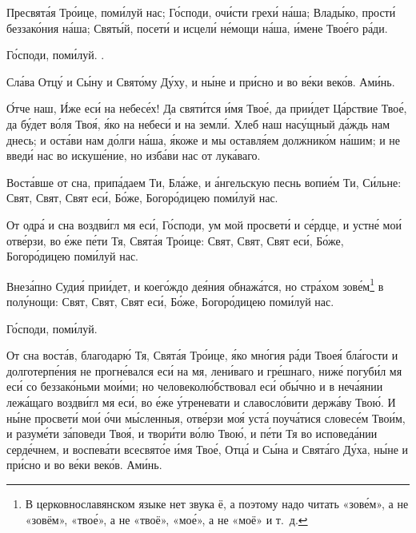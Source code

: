 \begin{mymulticols}

Пресвят\'{а}я Тр\'{о}ице, пом\'{и}луй нас; Г\'{о}споди, оч\'{и}сти грех\'{и} н\'{а}ша; Влад\'{ы}ко, прост\'{и} беззак\'{о}ния н\'{а}ша; Свят\'{ы}й, посет\'{и} и исцел\'{и} н\'{е}мощи н\'{а}ша, \'{и}мене Тво\'{е}го р\'{а}ди.

Г\'{о}споди, пом\'{и}луй. .

Сл\'{а}ва Отц\'{у} и С\'{ы}ну и Свят\'{о}му Д\'{у}ху, и н\'{ы}не и пр\'{и}сно и во в\'{е}ки век\'{о}в. Ам\'{и}нь.


\'{О}тче наш, \'{И}же ес\'{и} на небес\'{е}х! Да свят\'{и}тся \'{и}мя Тво\'{е}, да при\'{и}дет Ц\'{а}рствие Тво\'{е}, да б\'{у}дет в\'{о}ля Тво\'{я}, \'{я}ко на небес\'{и} и на земл\'{и}. Хлеб наш нас\'{у}щный д\'{а}ждь нам днесь; и ост\'{а}ви нам д\'{о}лги н\'{а}ша, \'{я}коже и мы оставл\'{я}ем должник\'{о}м н\'{а}шим; и не введ\'{и} нас во искуш\'{е}ние, но изб\'{а}ви нас от лук\'{а}ваго.


Вост\'{а}вше от сна, прип\'{а}даем Ти, Бл\'{а}же, и \'{а}нгельскую песнь вопи\'{е}м Ти, С\'{и}льне: Свят, Свят, Свят ес\'{и}, Б\'{о}же, Богор\'{о}дицею пом\'{и}луй нас.

\slavan

От одр\'{а} и сна воздв\'{и}гл мя ес\'{и}, Г\'{о}споди, ум мой просвет\'{и} и с\'{е}рдце, и устн\'{е} мо\'{и} отв\'{е}рзи, во \'{е}же п\'{е}ти Тя, Свят\'{а}я Тр\'{о}ице: Свят, Свят, Свят ес\'{и}, Б\'{о}же, Богор\'{о}дицею пом\'{и}луй нас.

\inynen

Внез\'{а}пно Суди\'{я} при\'{и}дет, и коег\'{о}ждо де\'{я}ния обнаж\'{а}тся, но стр\'{а}хом зов\'{е}м\footnote{В церковнославянском языке нет звука ё, а поэтому надо читать «зов\'{е}м», а не «зовём», «тво\'{е}», а не «твоё», «мо\'{е}», а не «моё» и т.~д.} в пол\'{у}нощи: Свят, Свят, Свят ес\'{и}, Б\'{о}же, Богор\'{о}дицею пом\'{и}луй нас.

Г\'{о}споди, пом\'{и}луй. 


От сна вост\'{а}в, благодар\'{ю} Тя, Свят\'{а}я Тр\'{о}ице, \'{я}ко мн\'{о}гия р\'{а}ди Твое\'{я} бл\'{а}гости и долготерп\'{е}ния не прогн\'{е}вался ес\'{и} на мя, лен\'{и}ваго и гр\'{е}шнаго, ниж\'{е} погуб\'{и}л мя ес\'{и} со беззак\'{о}ньми мо\'{и}ми; но человекол\'{ю}бствовал ес\'{и} об\'{ы}чно и в неч\'{а}янии леж\'{а}щаго воздв\'{и}гл мя ес\'{и}, во \'{е}же \'{у}треневати и славосл\'{о}вити держ\'{а}ву Тво\'{ю}. И н\'{ы}не просвет\'{и} мо\'{и} \'{о}чи м\'{ы}сленныя, отв\'{е}рзи мо\'{я} уст\'{а} поуч\'{а}тися словес\'{е}м Тво\'{и}м, и разум\'{е}ти з\'{а}поведи Тво\'{я}, и твор\'{и}ти в\'{о}лю Тво\'{ю}, и п\'{е}ти Тя во исповед\'{а}нии серд\'{е}чнем, и воспев\'{а}ти всесвят\'{о}е \'{и}мя Тво\'{е}, Отц\'{а} и С\'{ы}на и Свят\'{а}го Д\'{у}ха, н\'{ы}не и пр\'{и}сно и во в\'{е}ки век\'{о}в. Ам\'{и}нь.


\end{mymulticols}
